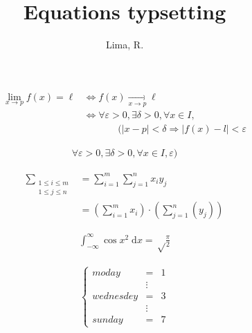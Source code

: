 \documentclass[letterpaper, onecolumn, twoside]{article}
\title{Equations typsetting}
\author{Lima, R.}
\begin{document}
\maketitle

\begin{equation}
\begin{aligned}
    \lim_{x \rightarrow p} f(x) = \ell 
    &\Leftrightarrow f(x) \xrightarrow[x \rightarrow p]{} \ell \\ 
    &\Leftrightarrow \forall\varepsilon > 0, \exists\delta > 0, \forall x \in I,\\
    & \phantom{\Leftrightarrow{}}\qquad(|x -p| < \delta \Rightarrow |f(x) -l| < \varepsilon
\end{aligned}
\end{equation}

\begin{equation}
\begin{aligned}
	\forall\varepsilon > 0, \exists\delta > 0, \forall x \in I, \varepsilon)
\end{aligned}
\end{equation}


\begin{equation}\begin{aligned}
	\sum_{\substack{1 \leq i \leq m\\ 1 \leq j \leq n}} &= \sum_{i=1}^m\sum_{j=1}^n x_i y_j \\
	&=\left(\sum_{i=1}^m x_i\right) \cdot \left(\sum_{j=1}^n (y_j)\right)
\end{aligned}\end{equation}

\begin{equation}\begin{aligned}
	\int_{-\infty}^{\infty} \cos x^2 \;\mathrm{d}x = \sqrt\frac{\pi}{2}
\end{aligned}\end{equation}

\begin{equation}\begin{aligned}
	\left\{\begin{array}{rcl}
		\mathit{moday} & = & 1 \\
		& \vdots \\
		\mathit{wednesdey} & = & 3 \\
		& \vdots \\
		\mathit{sunday} & = & 7
	\end{array}\right.
\end{aligned}\end{equation}
\end{document}
